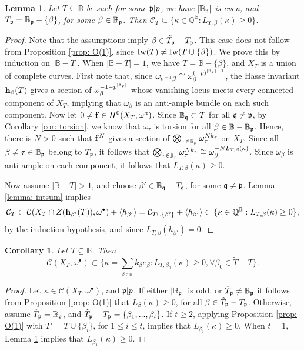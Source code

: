\documentclass[11pt,pdflatex]{amsart}
\theoremstyle{plain}
\newtheorem{lemma}[theorem]{Lemma}
\theoremstyle{definition}
\newcommand{\QQ}{\mathbf{Q}}
\theoremstyle{plain}
\newtheorem{cor}[theorem]{Corollary}
\theoremstyle{definition}
\theoremstyle{remark}
\numberwithin{equation}{section}
\numberwithin{figure}{section} \numberwithin{table}{subsection}
\newcommand{\gerp}{{\frak{p}}}
\newcommand{\gerq}{{\frak{q}}}
\newcommand{\calC}{{\mathcal{C}}}
\def\BB{\mathbb{B}}
\def\QQ{\mathbb{Q}}
\begin{document}
\begin{lemma}\label{lemma: exceptional} Let $T \subseteq \BB$ be such for some $\gerp|p$, we have $|\BB_\gerp|$ is even, and $T_\gerp=\BB_\gerp-\{\beta\}$, for some $\beta \in \BB_\gerp$. Then $\calC_T \subseteq \{\kappa \in \QQ^\BB: L_{T,\beta}(\kappa)\geq0\}$.
\end{lemma}

\begin{proof}  



Note that the assumptions imply $\beta \in \tilde{T}_\gerp-T_\gerp$. This case does not follow from Proposition \ref{prop: O(1)}, since ${\rm Iw}(T)\neq {\rm Iw}(T\cup\{\beta\})$. We prove this by induction on $|\BB-T|$. When $|\BB-T|=1$, we have $T= \BB-\{\beta\}$, and $X_T$ is a union of complete curves. First note that, since $\omega_{\sigma^{-1}\beta} \cong \omega_\beta^{(-p)^{|\BB_\gerp|-1}}$, the Hasse invariant ${\bf h}_\beta(T)$  gives a  section of $\omega_\beta^{-1-p^{|\BB_\gerp|}}$ whose vanishing locus meets every connected component of $X_T$, implying that $\omega_\beta$ is an anti-ample bundle on each such component. Now let  $0 \neq {\bf f} \in H^0(X_T,\omega^\kappa)$. Since $\BB_\gerq \subset T$ for all $\gerq\neq \gerp$, by Corollary \ref{cor: torsion}, we know that $\omega_\tau$ is torsion for all $\beta \in \BB-\BB_\gerp$. Hence, there is $N>0$ such that ${\bf f}^N$ gives a section of $\bigotimes_{\tau \in \BB_\gerp} \omega_\tau^{Nk_\tau}$ on $X_T$. Since all $\beta \neq \tau \in \BB_\gerp$ belong to $T_\gerp$, it follows that $\bigotimes_{\tau \in \BB_\gerp} \omega_\tau^{Nk_\tau} \cong \omega_\beta^{-NL_{T,\beta}(\kappa)}$. Since $\omega_\beta$ is anti-ample on each component, it follows that $L_{T,\beta}(\kappa)\geq 0$. 

Now assume $|\BB-T|>1$, and choose $\beta' \in \BB_\gerq-T_\gerq$, for some $\gerq \neq \gerp$. Lemma \ref{lemma: intsum} implies
$$\calC_T \subset \calC(X_T \cap Z({\bf h}_{\beta'}(T)),\omega^\bullet)+ \langle h_{\beta'}\rangle = \calC_{T \cup \{\beta'\}} + \langle h_{\beta'}\rangle \subset \{\kappa \in \QQ^\BB: L_{T,\beta}(\kappa)\geq 0\},$$ by the induction hypothesis, and since $L_{T,\beta}(h_{\beta'})=0$.
\end{proof}

\begin{cor} \label{cor: general case} Let $T \subseteq \BB$.  Then
$$\calC(X_T ,\omega^\bullet)  \subset \{\kappa=\sum_{_{\beta \in \BB}} k_\beta e_\beta : L_{T,\beta_0}(\kappa) \geq 0,  \forall \beta_0 \in \tilde{T}-T\}.$$
\end{cor}
\begin{proof} Let  $\kappa \in \calC(X_T ,\omega^\bullet)$, and $\gerp|p$. If either $|\BB_\gerp|$ is odd, or $\tilde{T}_\gerp \neq  \BB_\gerp$ it follows from Proposition \ref{prop: O(1)} that $L_{\beta}(\kappa) \geq 0$, for all $\beta \in \tilde{T}_\gerp-T_\gerp$.  Otherwise, assume $\tilde{T}_\gerp=\BB_\gerp$, and $\tilde{T}_\gerp-T_\gerp=\{\beta_1,...,\beta_t\}$. If $t\geq 2$, applying Proposition \ref{prop: O(1)} with $T'=T \cup\{\beta_i\}$, for $1 \leq i \leq t$, implies that $L_{\beta_i}(\kappa) \geq 0$. When $t=1$, Lemma \ref{lemma: exceptional} implies that $L_{\beta_1}(\kappa) \geq 0$.
\end{proof}
\end{document}
